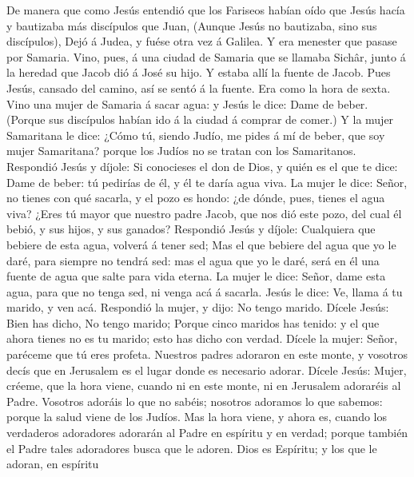  De manera que como Jesús entendió que los Fariseos habían
oído que Jesús hacía y bautizaba más discípulos que Juan, 
(Aunque Jesús no bautizaba, sino sus discípulos),  Dejó á
Judea, y fuése otra vez á Galilea.  Y era menester que
pasase por Samaria.  Vino, pues, á una ciudad de Samaria que
se llamaba Sichâr, junto á la heredad que Jacob dió á José su hijo.
 Y estaba allí la fuente de Jacob. Pues Jesús, cansado del
camino, así se sentó á la fuente. Era como la hora de sexta.
 Vino una mujer de Samaria á sacar agua: y Jesús le dice:
Dame de beber.  (Porque sus discípulos habían ido á la
ciudad á comprar de comer.)  Y la mujer Samaritana le dice:
¿Cómo tú, siendo Judío, me pides á mí de beber, que soy mujer
Samaritana? porque los Judíos no se tratan con los Samaritanos.
 Respondió Jesús y díjole: Si conocieses el don de Dios, y
quién es el que te dice: Dame de beber: tú pedirías de él, y él te daría
agua viva.  La mujer le dice: Señor, no tienes con qué
sacarla, y el pozo es hondo: ¿de dónde, pues, tienes el agua viva?
 ¿Eres tú mayor que nuestro padre Jacob, que nos dió este
pozo, del cual él bebió, y sus hijos, y sus ganados? 
Respondió Jesús y díjole: Cualquiera que bebiere de esta agua, volverá á
tener sed;  Mas el que bebiere del agua que yo le daré,
para siempre no tendrá sed: mas el agua que yo le daré, será en él una
fuente de agua que salte para vida eterna.  La mujer le
dice: Señor, dame esta agua, para que no tenga sed, ni venga acá á
sacarla.  Jesús le dice: Ve, llama á tu marido, y ven acá.
 Respondió la mujer, y dijo: No tengo marido. Dícele Jesús:
Bien has dicho, No tengo marido;  Porque cinco maridos has
tenido: y el que ahora tienes no es tu marido; esto has dicho con
verdad.  Dícele la mujer: Señor, paréceme que tú eres
profeta.  Nuestros padres adoraron en este monte, y
vosotros decís que en Jerusalem es el lugar donde es necesario adorar.
 Dícele Jesús: Mujer, créeme, que la hora viene, cuando ni
en este monte, ni en Jerusalem adoraréis al Padre. 
Vosotros adoráis lo que no sabéis; nosotros adoramos lo que sabemos:
porque la salud viene de los Judíos.  Mas la hora viene, y
ahora es, cuando los verdaderos adoradores adorarán al Padre en espíritu
y en verdad; porque también el Padre tales adoradores busca que le
adoren.  Dios es Espíritu; y los que le adoran, en espíritu
